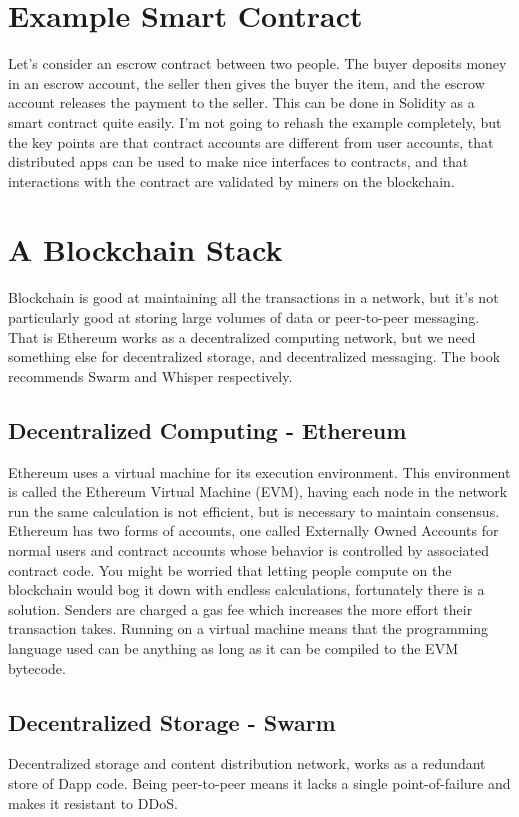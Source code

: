\documentclass{article}
\begin{document}
\section{Example Smart Contract}

Let's consider an escrow contract between two people. The buyer deposits money in an escrow account, the seller then gives the buyer the item, and the escrow account releases the payment to the seller. This can be done in Solidity as a smart contract quite easily. I'm not going to rehash the example completely, but the key points are that contract accounts are different from user accounts, that distributed apps can be used to make nice interfaces to contracts, and that interactions with the contract are validated by miners on the blockchain.

\section{A Blockchain Stack}

Blockchain is good at maintaining all the transactions in a network, but it's not particularly good at storing large volumes of data or peer-to-peer messaging. That is Ethereum works as a decentralized computing network, but we need something else for decentralized storage, and decentralized messaging. The book recommends Swarm and Whisper respectively.

\subsection{Decentralized Computing - Ethereum}

Ethereum uses a virtual machine for its execution environment. This environment is called the Ethereum Virtual Machine (EVM), having each node in the network run the same calculation is not efficient, but is necessary to maintain consensus. Ethereum has two forms of accounts, one called Externally Owned Accounts for normal users and contract accounts whose behavior is controlled by associated contract code. You might be worried that letting people compute on the blockchain would bog it down with endless calculations, fortunately there is a solution. Senders are charged a gas fee which increases the more effort their transaction takes. Running on a virtual machine means that the programming language used can be anything as long as it can be compiled to the EVM bytecode.

\subsection{Decentralized Storage - Swarm}
Decentralized storage and content distribution network, works as a redundant store of Dapp code. Being peer-to-peer means it lacks a single point-of-failure and makes it resistant to DDoS.
\end{document}
